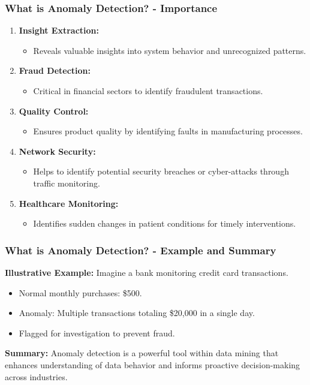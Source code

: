 \documentclass{beamer}
\begin{document}
\begin{frame}[fragile]
    \frametitle{What is Anomaly Detection? - Importance}
    \begin{enumerate}
        \item \textbf{Insight Extraction:} 
            \begin{itemize}
                \item Reveals valuable insights into system behavior and unrecognized patterns.
            \end{itemize}
        \item \textbf{Fraud Detection:} 
            \begin{itemize}
                \item Critical in financial sectors to identify fraudulent transactions.
            \end{itemize}
        \item \textbf{Quality Control:} 
            \begin{itemize}
                \item Ensures product quality by identifying faults in manufacturing processes.
            \end{itemize}
        \item \textbf{Network Security:}
            \begin{itemize}
                \item Helps to identify potential security breaches or cyber-attacks through traffic monitoring.
            \end{itemize}
        \item \textbf{Healthcare Monitoring:}
            \begin{itemize}
                \item Identifies sudden changes in patient conditions for timely interventions.
            \end{itemize}
    \end{enumerate}
\end{frame}

\begin{frame}[fragile]
    \frametitle{What is Anomaly Detection? - Example and Summary}
    \textbf{Illustrative Example:} 
    Imagine a bank monitoring credit card transactions. 
    \begin{itemize}
        \item Normal monthly purchases: \$500. 
        \item Anomaly: Multiple transactions totaling \$20,000 in a single day.
        \item Flagged for investigation to prevent fraud.
    \end{itemize}
    
    \textbf{Summary:}
    Anomaly detection is a powerful tool within data mining that enhances understanding of data behavior and informs proactive decision-making across industries.
\end{frame}
\end{document}
